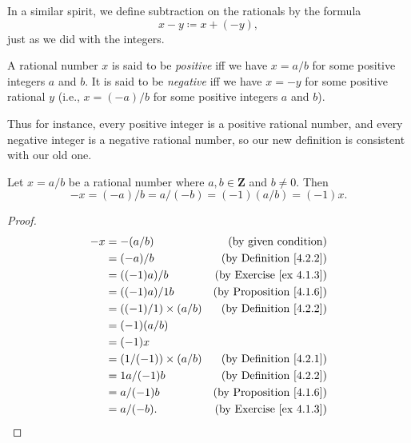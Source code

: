 \begin{note}
    In a similar spirit, we define subtraction on the rationals by the formula
    \[
        x - y \coloneqq x + (-y),
    \]
    just as we did with the integers.
\end{note}

\begin{definition}\label{4.2.6}
    A rational number \(x\) is said to be \emph{positive} iff we have \(x = a / b\) for some positive integers \(a\) and \(b\).
    It is said to be \emph{negative} iff we have \(x = -y\) for some positive rational \(y\)
    (i.e., \(x = (-a) / b\) for some positive integers \(a\) and \(b\)).
\end{definition}

\begin{note}
    Thus for instance, every positive integer is a positive rational number, and every negative integer is a negative rational number, so our new definition is consistent with our old one.
\end{note}

\begin{additional corollary}\label{ac 4.2.3}
Let \(x = a / b\) be a rational number where \(a, b \in \mathbf{Z}\) and \(b \neq 0\).
Then
\[
    -x = (-a) / b = a / (-b) = (-1)(a / b) = (-1)x.
\]
\end{additional corollary}

\begin{proof}
    \begin{align*}
        -x & = -(a / b)                  & \text{(by given condition)}         \\
           & = (-a) / b                  & \text{(by Definition \ref{4.2.2})}  \\
           & = ((-1)a) / b               & \text{(by Exercise \ref{ex 4.1.3})} \\
           & = ((-1)a) / 1b              & \text{(by Proposition \ref{4.1.6})} \\
           & = ((-1) / 1) \times (a / b) & \text{(by Definition \ref{4.2.2})}  \\
           & = (-1)(a / b)                                                     \\
           & = (-1)x                                                           \\
           & = (1 / (-1)) \times (a / b) & \text{(by Definition \ref{4.2.1})}  \\
           & = 1a / (-1)b                & \text{(by Definition \ref{4.2.2})}  \\
           & = a / (-1)b                 & \text{(by Proposition \ref{4.1.6})} \\
           & = a / (-b).                 & \text{(by Exercise \ref{ex 4.1.3})}
    \end{align*}
\end{proof}

